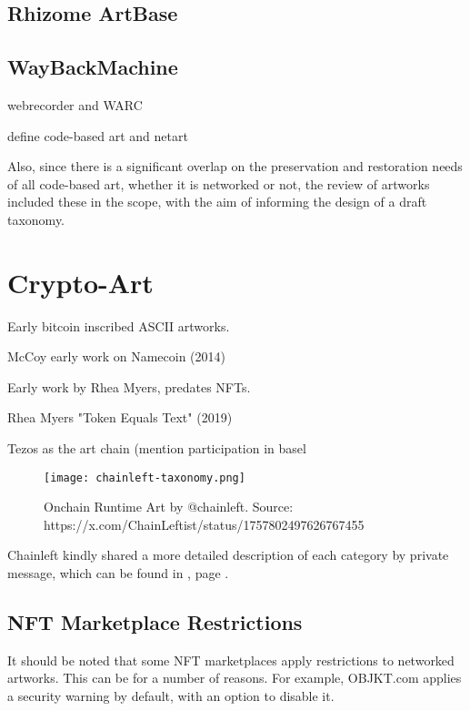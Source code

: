 \subsection{Rhizome ArtBase}


\subsection{WayBackMachine}

webrecorder and WARC





\todo define code-based art and netart

Also, since there is a significant overlap on the preservation and restoration needs of all code-based art, whether it is networked or not, the review of artworks included these in the scope, with the aim of informing the design of a draft taxonomy.




\section{Crypto-Art}


Early bitcoin inscribed ASCII artworks.

McCoy early work on Namecoin (2014)

Early work by Rhea Myers, predates NFTs.

Rhea Myers "Token Equals Text" (2019)


Tezos as the art chain (mention participation in basel


\todo

\begin{figure}[h]
    \centering
    \texttt{[image: chainleft-taxonomy.png]}
    \caption[Onchain Runtime Art]{Onchain Runtime Art by @chainleft. Source: https://x.com/ChainLeftist/status/1757802497626767455}
    \label{fig:onchainruntimeart}
\end{figure}


Chainleft kindly shared a more detailed description of each category by private message, which can be found in , page \pageref{appx:chainleft-taxonomy}.


\subsection{NFT Marketplace Restrictions}

It should be noted that some NFT marketplaces apply restrictions to networked artworks. This can be for a number of reasons.
For example, OBJKT.com applies a security warning by default, with an option to disable it.





